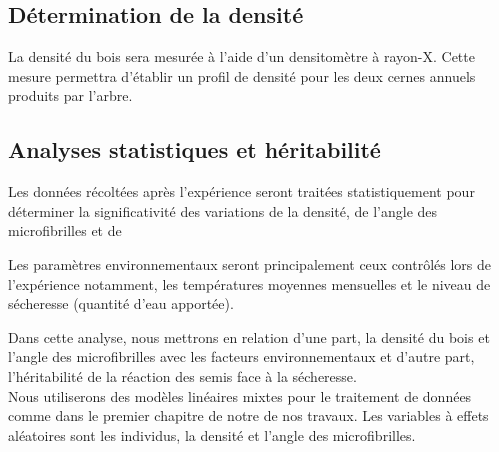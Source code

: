 \documentclass{report}
\begin{document}
\subsection*{Détermination de la densité}
La densité du bois sera mesurée à l'aide d'un densitomètre à rayon-X. 
Cette mesure permettra d'établir un profil de densité pour les deux cernes annuels produits par l'arbre.



\subsection*{Analyses statistiques et héritabilité}
Les données récoltées après l'expérience seront traitées statistiquement pour déterminer la significativité des variations de la densité, de l'angle des microfibrilles et de %

 Les paramètres environnementaux seront principalement ceux contrôlés lors de l'expérience notamment, les températures moyennes mensuelles et le niveau de sécheresse (quantité d'eau apportée).

Dans cette analyse, nous mettrons en relation d'une part, la densité du bois et l'angle des microfibrilles avec les facteurs environnementaux et d'autre part, l'héritabilité de la réaction des semis face à la sécheresse. \\ %

Nous utiliserons des modèles linéaires mixtes pour le traitement de données comme dans le premier chapitre de notre de nos travaux. Les variables à effets aléatoires sont les individus, la densité et l'angle des microfibrilles. %
\end{document}
